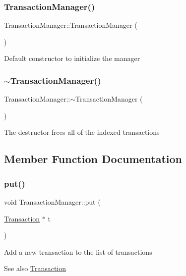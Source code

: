 \subsubsection{\texorpdfstring{Transaction\+Manager()}{TransactionManager()}}
{\footnotesize\ttfamily Transaction\+Manager\+::\+Transaction\+Manager (\begin{DoxyParamCaption}{ }\end{DoxyParamCaption})\hspace{0.3cm}{\ttfamily [default]}}

Default constructor to initialize the manager \mbox{\label{classTransactionManager_ab48dc6bf966c5c98e0734e1b1d819ef9}} 
\subsubsection{\texorpdfstring{$\sim$\+Transaction\+Manager()}{~TransactionManager()}}
{\footnotesize\ttfamily Transaction\+Manager\+::$\sim$\+Transaction\+Manager (\begin{DoxyParamCaption}{ }\end{DoxyParamCaption})}

The destructor frees all of the indexed transactions 

\subsection{Member Function Documentation}
\mbox{\label{classTransactionManager_a7956f511249bba3466ce3f3b57ee4518}} 
\subsubsection{\texorpdfstring{put()}{put()}}
{\footnotesize\ttfamily void Transaction\+Manager\+::put (\begin{DoxyParamCaption}\item[{\mbox{\hyperlink{classTransaction}{Transaction}} $\ast$}]{t }\end{DoxyParamCaption})}

Add a new transaction to the list of transactions \begin{DoxySeeAlso}{See also}
\mbox{\hyperlink{classTransaction}{Transaction}}
\end{DoxySeeAlso}

